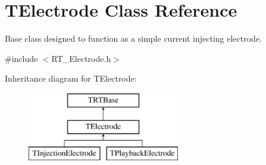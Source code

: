 \hypertarget{class_t_electrode}{\section{T\+Electrode Class Reference}
\label{class_t_electrode}
}


Base class designed to function as a simple current injecting electrode.  




{\ttfamily \#include $<$R\+T\+\_\+\+Electrode.\+h$>$}

Inheritance diagram for T\+Electrode\+:\begin{figure}[H]
\begin{center}
\leavevmode
\includegraphics[height=3.000000cm]{class_t_electrode}
\end{center}
\end{figure}
